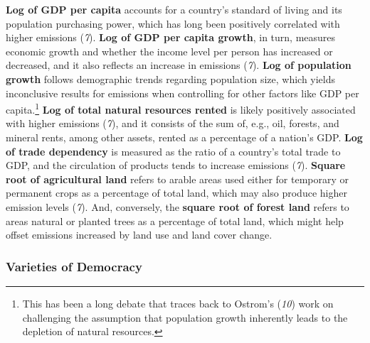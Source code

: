 \documentclass[
  12pt,
  letterpaper,
]{article}
\begin{document}
\textbf{Log of GDP per capita} accounts for a country's standard of
living and its population purchasing power, which has long been
positively correlated with higher emissions (\emph{7}). \textbf{Log of
GDP per capita growth}, in turn, measures economic growth and whether
the income level per person has increased or decreased, and it also
reflects an increase in emissions (\emph{7}). \textbf{Log of population
growth} follows demographic trends regarding population size, which
yields inconclusive results for emissions when controlling for other
factors like GDP per capita.\footnote{This has been a long debate that
  traces back to Ostrom's (\emph{10}) work on challenging the assumption
  that population growth inherently leads to the depletion of natural
  resources.} \textbf{Log of total natural resources rented} is likely
positively associated with higher emissions (\emph{7}), and it consists
of the sum of, e.g., oil, forests, and mineral rents, among other
assets, rented as a percentage of a nation's GDP. \textbf{Log of trade
dependency} is measured as the ratio of a country's total trade to GDP,
and the circulation of products tends to increase emissions (\emph{7}).
\textbf{Square root of agricultural land} refers to arable areas used
either for temporary or permanent crops as a percentage of total land,
which may also produce higher emission levels (\emph{7}). And,
conversely, the \textbf{square root of forest land} refers to areas
natural or planted trees as a percentage of total land, which might help
offset emissions increased by land use and land cover change.

\subsubsection{Varieties of Democracy}\label{varieties-of-democracy}
\end{document}

